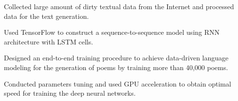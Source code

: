 \documentclass[letterpaper]{deedy-resume-openfont}
\begin{document}
\descript{}
\location{}
\begin{tightemize}
\item Collected large amount of dirty textual data from the Internet and processed data for the text generation.
\item Used TensorFlow to construct a sequence-to-sequence model using RNN architecture with LSTM cells.
\item Designed an end-to-end training procedure to achieve data-driven language modeling for the generation of poems by training more than 40,000 poems.
\item Conducted parameters tuning and used GPU acceleration to obtain optimal speed for training the deep neural networks.
\end{tightemize}
\sectionsep



\end{document}
